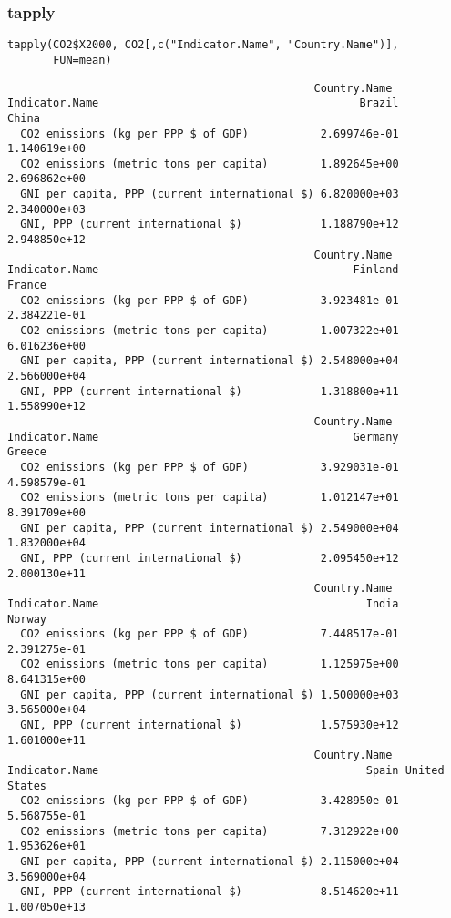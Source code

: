 \documentclass[xcolor={usenames,svgnames,dvipsnames}]{beamer}
\begin{document}
\begin{frame}[fragile]
\frametitle{tapply}
\label{sec-3-5}


\lstset{language=R}
\begin{lstlisting}
tapply(CO2$X2000, CO2[,c("Indicator.Name", "Country.Name")],
       FUN=mean)
\end{lstlisting}


\begin{verbatim}
                                               Country.Name
Indicator.Name                                        Brazil        China
  CO2 emissions (kg per PPP $ of GDP)           2.699746e-01 1.140619e+00
  CO2 emissions (metric tons per capita)        1.892645e+00 2.696862e+00
  GNI per capita, PPP (current international $) 6.820000e+03 2.340000e+03
  GNI, PPP (current international $)            1.188790e+12 2.948850e+12
                                               Country.Name
Indicator.Name                                       Finland       France
  CO2 emissions (kg per PPP $ of GDP)           3.923481e-01 2.384221e-01
  CO2 emissions (metric tons per capita)        1.007322e+01 6.016236e+00
  GNI per capita, PPP (current international $) 2.548000e+04 2.566000e+04
  GNI, PPP (current international $)            1.318800e+11 1.558990e+12
                                               Country.Name
Indicator.Name                                       Germany       Greece
  CO2 emissions (kg per PPP $ of GDP)           3.929031e-01 4.598579e-01
  CO2 emissions (metric tons per capita)        1.012147e+01 8.391709e+00
  GNI per capita, PPP (current international $) 2.549000e+04 1.832000e+04
  GNI, PPP (current international $)            2.095450e+12 2.000130e+11
                                               Country.Name
Indicator.Name                                         India       Norway
  CO2 emissions (kg per PPP $ of GDP)           7.448517e-01 2.391275e-01
  CO2 emissions (metric tons per capita)        1.125975e+00 8.641315e+00
  GNI per capita, PPP (current international $) 1.500000e+03 3.565000e+04
  GNI, PPP (current international $)            1.575930e+12 1.601000e+11
                                               Country.Name
Indicator.Name                                         Spain United States
  CO2 emissions (kg per PPP $ of GDP)           3.428950e-01  5.568755e-01
  CO2 emissions (metric tons per capita)        7.312922e+00  1.953626e+01
  GNI per capita, PPP (current international $) 2.115000e+04  3.569000e+04
  GNI, PPP (current international $)            8.514620e+11  1.007050e+13
\end{verbatim}
\end{frame}
\end{document}
